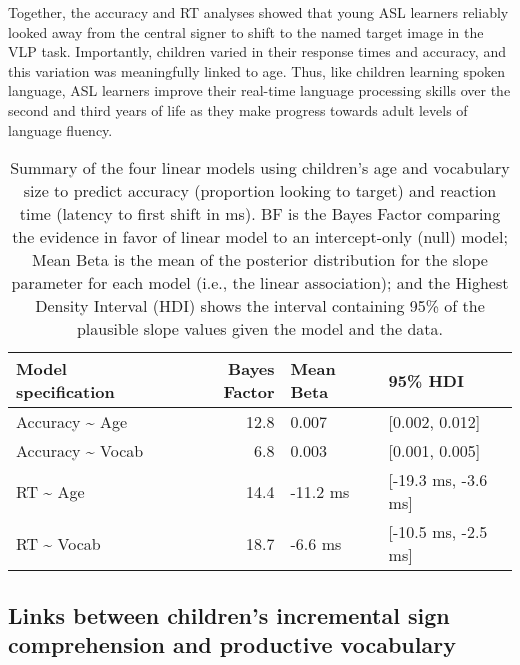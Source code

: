 \documentclass[oneside]{report}
\begin{document}
Together, the accuracy and RT analyses showed that young ASL learners
reliably looked away from the central signer to shift to the named
target image in the VLP task. Importantly, children varied in their
response times and accuracy, and this variation was meaningfully linked
to age. Thus, like children learning spoken language, ASL learners
improve their real-time language processing skills over the second and
third years of life as they make progress towards adult levels of
language fluency.
\begin{longtable}[t]{>{\raggedright\arraybackslash}p{4cm}rll}
\caption[Summary of the four linear models using children's age and vocabulary size to predict accuracy and reaction time]{\label{tab:sol-bf-table}Summary of the four linear models using children's age and vocabulary size to predict accuracy (proportion looking to target) and reaction time (latency to first shift in ms). BF is the Bayes Factor comparing the evidence in favor of linear model to an intercept-only (null) model; Mean Beta is the mean of the posterior distribution for the slope parameter for each model (i.e., the linear association); and the Highest Density Interval (HDI) shows the interval containing 95\% of the plausible slope values given the model and the data.}\\
\toprule
\textbf{Model specification} & \textbf{Bayes Factor} & \textbf{Mean Beta} & \textbf{95\% HDI}\\
\midrule
Accuracy \textasciitilde{} Age & 12.8 & 0.007 & [0.002, 0.012]\\
Accuracy \textasciitilde{} Vocab & 6.8 & 0.003 & [0.001, 0.005]\\
RT \textasciitilde{} Age & 14.4 & -11.2 ms & [-19.3 ms, -3.6 ms]\\
RT \textasciitilde{} Vocab & 18.7 & -6.6 ms & [-10.5 ms, -2.5 ms]\\
\bottomrule
\end{longtable}
\hypertarget{links-between-childrens-incremental-sign-comprehension-and-productive-vocabulary}{%
\subsection{Links between children's incremental sign comprehension and
productive
vocabulary}\label{links-between-childrens-incremental-sign-comprehension-and-productive-vocabulary}}
\end{document}
